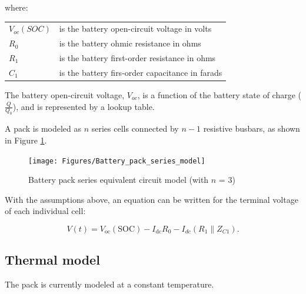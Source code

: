 \documentclass{article}
\begin{document}
		where:
		\begin{center}
		\begin{tabular}{l l}
			$V_{oc}(SOC)$	&	is the battery open-circuit voltage in volts	\\
			$R_{0}$			&	is the battery ohmic resistance in ohms \\
			$R_{1}$			& 	is the battery first-order resistance in ohms \\
			$C_{1}$			& 	is the battery firs-order capacitance in farads
		\end{tabular}
		\end{center}
		
		The battery open-circuit voltage, $V_{oc}$, is a function of the battery state of charge ($\frac{Q}{Q_0}$), and is represented by a lookup table.
		
		A pack is modeled as $n$ series cells connected by $n-1$ resistive busbars, as shown in Figure \ref{fig:Battery_pack_series_model}.
		
		\begin{figure}[h!]
				\centering
				\texttt{[image: Figures/Battery\_pack\_series\_model]}
				\caption{Battery pack series equivalent circuit model (with $n$ = 3)}
				\label{fig:Battery_pack_series_model}
		\end{figure}
		\FloatBarrier
		
		With the assumptions above, an equation can be written for the terminal voltage of each individual cell:
		
		\begin{equation}
			V(t) = V_\text{oc}(\text{SOC}) - I_\text{dc} R_0 - I_{dc}\left( R_1 \parallel Z_{C1} \right).
		\end{equation}
		
	\subsection{Thermal model}
		The pack is currently modeled at a constant temperature.
	
\end{document}
